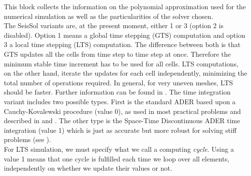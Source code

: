 \documentclass[12pt,twoside]{article}
\begin{document}
This block collects the information on the polynomial approximation used for the numerical simulation
as well as the particularities of the solver chosen. \\
The SeisSol variants are, at the present moment, either 1 or 3 (option 2 is disabled).
Option 1 means a global time stepping (GTS) computation and option 3 a local time stepping (LTS) computation.
The difference between both is that GTS updates all the cells from time step to time step at once.
Therefore the minimum stable time increment has to be used for all cells.
LTS computations, on the other hand, iterate the updates for each cell independently,
minimizing the total number of operations required.
In general, for very uneven meshes, LTS should be faster.
Further information can be found in \cite{DumbserKaeserToro07}.
The time integration variant includes two possible types.
First is the standard ADER based upon a Cauchy-Kovalewski procedure (value 0), as used in most practical problems and
described in \cite{KaeserDumbser06} and \cite{DumbserKaeser06}.
The other type is the Space-Time Discontinuous ADER time integration (value 1) which is just as accurate but
more robust for solving stiff problems (see \cite{PuenteDumbserKaeserIgel07}). \\
For LTS simulation, we must specify what we call a computing \textit{cycle}.
Using a value 1 means that one cycle is fulfilled each time we loop over all elements,
independently on whether we update their values or not.
\end{document}
